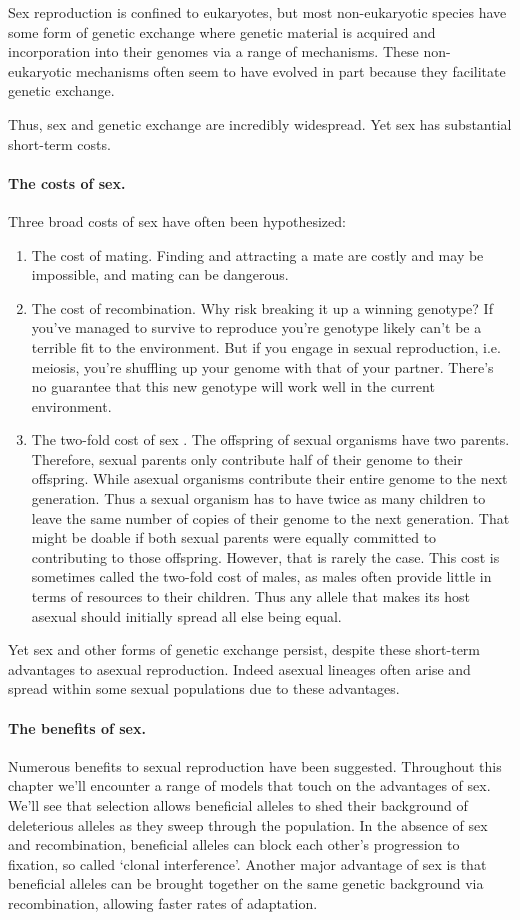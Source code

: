 Sex reproduction is confined to eukaryotes, but most non-eukaryotic species have some form of genetic exchange where genetic material is acquired and incorporation into their genomes via a range of mechanisms. These non-eukaryotic mechanisms often seem to have evolved in part because they facilitate genetic exchange. 

Thus, sex and genetic exchange are incredibly widespread. Yet sex has substantial short-term costs. 

\paragraph{The costs of sex.}
Three broad costs of sex have often been hypothesized:
\begin{enumerate}
\item  The cost of mating. Finding and attracting a mate are costly and may be impossible, and mating can be dangerous.
\item  The cost of recombination. Why risk breaking it up a winning genotype? If you've managed to survive to reproduce you're genotype likely can't be a terrible fit to the environment. But if you engage in sexual reproduction, i.e. meiosis, you're shuffling up your genome with that of your partner. There's no guarantee that this new genotype will work well in the current environment. 
\item The two-fold cost of sex \citep{smith1971origin}. The offspring of sexual organisms have two parents. Therefore, sexual parents only contribute half of their genome to their offspring. While asexual organisms contribute their entire genome to the next generation. Thus a sexual organism has to have twice as many children to leave the same number of copies of their genome to the next generation. That might be doable if both sexual parents were equally committed to contributing to those offspring. However, that is rarely the case. This cost is sometimes called the two-fold cost of males, as males often provide little in terms of resources to their children. Thus any allele that makes its host asexual should initially spread all else being equal. 
\end{enumerate}
Yet sex and other forms of genetic exchange persist, despite these short-term advantages to asexual reproduction. Indeed asexual lineages often arise and spread within some sexual populations due to these advantages. 

\paragraph{The benefits of sex.}
Numerous benefits to sexual reproduction have been suggested. Throughout this chapter we'll encounter a range of models that touch on the advantages of sex. We'll see that selection allows beneficial alleles to shed their background of deleterious alleles as they sweep through the population. In the absence of sex and recombination, beneficial alleles can block each other's progression to fixation, so called `clonal interference'. Another major advantage of sex is that beneficial alleles can be brought together on the same genetic background via recombination, allowing faster rates of adaptation. 

